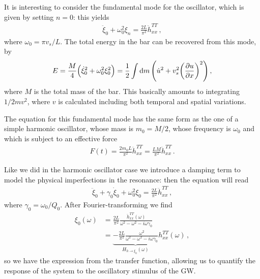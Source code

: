 \documentclass[main.tex]{subfiles}
\begin{document}

It is interesting to consider the fundamental mode for the oscillator, which is given by setting \(n =0\): this yields 
%
\begin{align}
\ddot{\xi}_{0} + \omega_0^2 \xi_{n} = \frac{2L}{\pi^2} \ddot{h}^{TT}_{xx}
\,,
\end{align}
%
where \(\omega_0 = \pi v_s /L\). 
The total energy in the bar can be recovered from this mode, by 
%
\begin{align}
E = \frac{M}{4} \qty(\dot{\xi}_{0}^2 + \omega_0^2 \xi_0^2 )
= \frac{1}{2} \int \dd{m} \qty(\dot{u}^2 + v_s^2 \qty(\pdv{u}{x})^2)
\,,
\end{align}
%
where \(M\) is the total mass of the bar. This basically amounts to integrating \(1/2 m v^2\), where \(v\) is calculated including both temporal and spatial variations. 

The equation for this fundamental mode has the same form as the one of a simple harmonic oscillator, whose mass is \(m_0 = M/2\), whose frequency is \(\omega_0 \) and which is subject to an effective force 
%
\begin{align}
F(t) = \frac{2  m_0  L}{\pi^2} \ddot{h}_{xx}^{TT} = \frac{LM}{\pi^2}
\ddot{h}^{TT}_{xx}
\,.
\end{align}

Like we did in the harmonic oscillator case we introduce a damping term to model the physical imperfections in the resonance: then the equation will read 
%
\begin{align} \label{eq:damped-zeroth-mode-resonant-bar}
\ddot{\xi}_{0} + \gamma_0 \dot{\xi}_{0} + \omega_0^2 \xi_0 = \frac{2L}{\pi^2} \ddot{h}^{TT}_{xx}
\,,
\end{align}
%
where \(\gamma_0 = \omega_0 / Q_0 \). 
After Fourier-transforming we find 
%
\begin{align}
\xi_0 (\omega ) 
&= \frac{2L}{\pi^2} \frac{\ddot{h}_{xx}^{TT} (\omega )}{\omega^2- \omega^2 - i \omega \gamma_0 }  \\
&= \underbrace{-\frac{2L}{\pi^2} \frac{\omega^2}{\omega^2- \omega^2 - i \omega \gamma_0 }}_{H_{h \to \xi_0 } (\omega )}  h_{xx}^{TT} (\omega )
\,,
\end{align}
%
so we have the expression from the transfer function, allowing us to quantify the response of the system to the oscillatory stimulus of the GW. 
\end{document}
